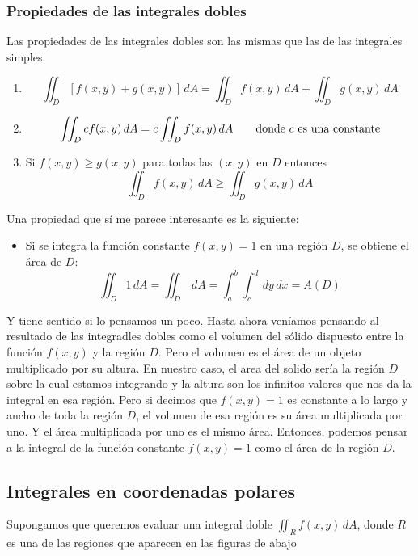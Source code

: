 \documentclass[12pt]{article}
\begin{document}
\subsubsection{Propiedades de las integrales dobles}
Las propiedades de las integrales dobles son las mismas que las de las integrales simples:
\begin{enumerate}[1.]
  \item \[
	  \iint_{D} \left[f(x,y)+g(x,y)\right] \,dA = \iint_{D} f(x,y) \,dA + \iint_{D} g(x,y) \,dA
  \]

  \item \[
    \iint_{D} cf(x,y) \,dA = c\iint_{D} f(x,y) \,dA \qquad \text{donde $ c $ es una constante}
  \]

  \item Si $ f(x,y)\geq g(x,y) $ para todas las $ (x,y) $ en $ D $ entonces
	  \[
	    \iint_{D} f(x,y) \,dA \geq \iint_{D} g(x,y) \,dA
	  \]
\end{enumerate}

Una propiedad que sí me parece interesante es la siguiente:
\begin{itemize}
  \item Si se integra la función constante $ f(x,y)=1 $ en una región $ D $, se obtiene el área de $ D $:
	  \[
	    \iint_{D} 1 \,dA = \iint_{D}  \,dA = \int_{a}^{b} \int_{c}^{d}  \,dy\,dx = A(D)
	  \]
\end{itemize}

Y tiene sentido si lo pensamos un poco. Hasta ahora veníamos pensando al resultado de las integradles dobles como el volumen del sólido dispuesto entre la función $ f(x,y) $ y la región $ D $. Pero el volumen es el área de un objeto multiplicado por su altura. En nuestro caso, el area del solido sería la región $ D $ sobre la cual estamos integrando y la altura son los infinitos valores que nos da la integral en esa región. Pero si decimos que $ f(x,y)=1 $ es constante a lo largo y ancho de toda la región $ D $, el volumen de esa región es su área multiplicada por uno. Y el área multiplicada por uno es el mismo área. Entonces, podemos pensar a la integral de la función constante $ f(x,y)=1 $ como el área de la región $ D $.

\subsection{Integrales en coordenadas polares}
Supongamos que queremos evaluar una integral doble $ \iint_{R} f(x,y) \,dA $, donde $ R $ es una de las regiones que aparecen en las figuras de abajo
\end{document}
